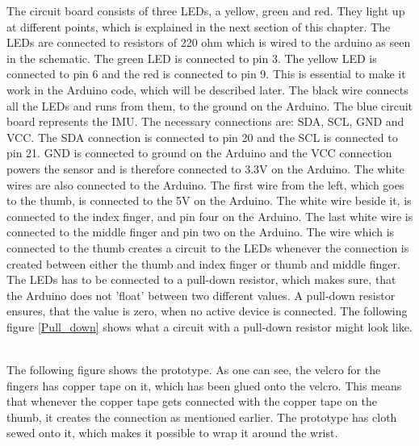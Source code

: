 The circuit board consists of three LEDs, a yellow, green and red. They light up at different points, which is explained in the next section of this chapter.
The LEDs are connected to resistors of 220 ohm which is wired to the arduino as seen in the schematic. The green LED is connected to pin 3. 
The yellow LED is connected to pin 6 and the red is connected to pin 9. This is essential to make it work in the Arduino code, which will be described later. 
The black wire connects all the LEDs and runs from them, to the ground on the Arduino. The blue circuit board represents the IMU. The necessary connections are: SDA, SCL, GND and VCC. 
The SDA connection is connected to pin 20 and the SCL is connected to pin 21. GND is connected to ground on the Arduino and the VCC connection powers the sensor and is therefore
connected to 3.3V on the Arduino. The white wires are also connected to the Arduino. The first wire from the left, which goes to the thumb, is connected to the 5V on the Arduino. 
The white wire beside it, is connected to the index finger, and pin four on the Arduino. The last white wire is connected to the middle finger and pin two on the Arduino.
The wire which is connected to the thumb creates a circuit to the LEDs whenever the connection is created between either the thumb and index finger or thumb and middle finger. \\


The LEDs has to be connected to a pull-down resistor\citep{Pulldown_res}, which makes sure, that the Arduino does not 'float' between two different values. A pull-down resistor ensures, that the value is zero, when no active device is connected.
The following figure \ref{Pull_down} shows what a circuit with a pull-down resistor might look like. \\


\begin{minipage}{\linewidth}%
\label{pull_down}
\end{minipage}\\

The following figure shows the prototype. As one can see, the velcro for the fingers has copper tape on it, which has been glued onto the velcro. 
This means that whenever the copper tape gets connected with the copper tape on the thumb, it creates the connection as mentioned earlier. 
The prototype has cloth sewed onto it, which makes it possible to wrap it around the wrist. 


